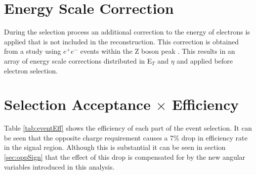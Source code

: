 \section{Energy Scale Correction}

   During the selection process an additional correction to the energy of electrons is applied that is not included in the reconstruction. This correction is obtained from a study using $e^{+}e^{-}$ events within the Z boson peak \cite{ATLAS-CONF-2014-032}. This results in an array of energy scale corrections distributed in E$_{T}$ and $\eta$ and applied before electron selection.




\section{\texorpdfstring{Selection Acceptance $\times$ Efficiency}{Selection Acceptance x Efficiency}}

   Table \ref{tab:eventEff} shows the efficiency of each part of the event selection. It can be seen that the opposite charge requirement causes a 7\% drop in efficiency rate in the signal region. Although this is substantial it can be seen in section \ref{sec:oppSign} that the effect of this drop is compensated for by the new angular variables introduced in this analysis.





